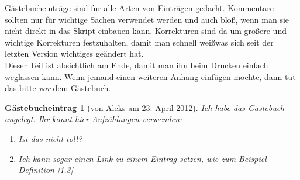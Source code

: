\documentclass[a4paper,12pt]{report}
\theoremstyle{break}
\theoremstyle{nonumberbreak}
\newtheorem{gast}{G\"astebucheintrag}
\theoremstyle{nonumberplain}
\begin{document}
G\"astebucheintr\"age sind f\"ur alle Arten von Eintr\"agen gedacht. Kommentare sollten nur f\"ur wichtige Sachen verwendet werden und auch blo\ss,  wenn man sie nicht direkt in das Skript einbauen kann. Korrekturen sind da um gr\"o\ss ere und wichtige Korrekturen festzuhalten, damit man schnell wei\ss was sich seit der letzten Version wichtiges ge\"andert hat.\\
Dieser Teil ist absichtlich am Ende, damit man ihn beim Drucken einfach weglassen kann. Wenn jemand einen weiteren Anhang einf\"ugen m\"ochte, dann tut das bitte \emph{vor} dem G\"astebuch.\\

\begin{gast}[von Aleks am 23. April 2012]
Ich habe das G\"astebuch angelegt. Ihr k\"onnt hier Aufz\"ahlungen verwenden:
\begin{enumerate}[1)]
\item
	Ist das nicht toll?
\item
	Ich kann sogar einen Link zu einem Eintrag setzen, wie zum Beispiel Definition \ref{1.3}
\end{enumerate}
\end{gast}
\end{document}
